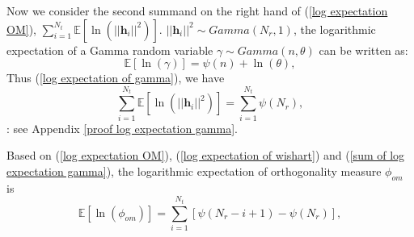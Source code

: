 \documentclass[12pt, draftclsnofoot, onecolumn]{IEEEtran}
\begin{document}
Now we consider the second summand on the right hand of (\ref{log expectation OM}), $\sum_{i=1}^{N_{t}}\mathbb{E}[\ln(||\mathbf{h}_{i}||^{2})]$. $||\mathbf{h}_{i}||^{2}\sim Gamma(N_{r}, 1)$, the logarithmic expectation of a Gamma random variable $\gamma\sim Gamma(n, \theta)$ can be written as:
\begin{equation}
\mathbb{E}[\ln(\gamma)]=\psi(n)+\ln(\theta),
\label{log expectation of gamma}
\end{equation}
Thus (\ref{log expectation of gamma}), we have
\begin{equation}
\sum_{i=1}^{N_{t}}\mathbb{E}[\ln(||\mathbf{h}_{i}||^{2})]=\sum_{i=1}^{N_{t}}\psi(N_{r}),
\label{sum of log expectation gamma}
\end{equation}
\proof: see Appendix \ref{proof log expectation gamma}.

Based on (\ref{log expectation OM}), (\ref{log expectation of wishart}) and (\ref{sum of log expectation gamma}), the logarithmic expectation of orthogonality measure $\phi_{om}$ is 
\begin{equation}
\mathbb{E}[\ln(\phi_{om})]=\sum_{i=1}^{N_{t}}[\psi(N_{r}-i+1)-\psi(N_{r})],
\label{final log expectation OM}
\end{equation}
\end{document}
